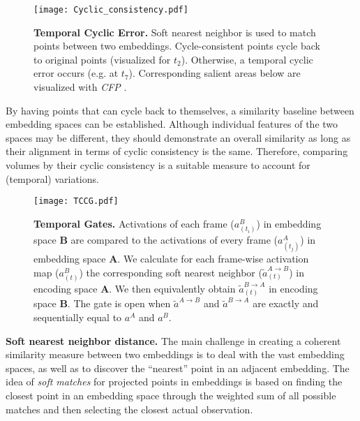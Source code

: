 \documentclass[final,5p,times,twocolumn]{elsarticle}
\begin{document}
\begin{figure}[!htb]
\centering
\texttt{[image: Cyclic\_consistency.pdf]}
\caption{\textbf{Temporal Cyclic Error.} Soft nearest neighbor is used to match points between two embeddings. Cycle-consistent points cycle back to original points (visualized for $t_{2}$). Otherwise, a temporal cyclic error occurs (e.g. at $t_{7}$). Corresponding salient areas below are visualized with \textit{CFP} \citep{stergiou2019class}.}
\label{fig:Cyclic_consistency}
\end{figure}

By having points that can cycle back to themselves, a similarity baseline between embedding spaces can be established. Although individual features of the two spaces may be different, they should demonstrate an overall similarity as long as their alignment in terms of cyclic consistency is the same. Therefore, comparing volumes by their cyclic consistency is a suitable measure to account for (temporal) variations.

\begin{figure*}
\centering
\texttt{[image: TCCG.pdf]}
\caption{\textbf{Temporal Gates.} Activations of each frame ($a_{(t_i)}^{B}$) in embedding space \textbf{B} are compared to the activations of every frame ($a_{(t_j)}^{A}$) in embedding space \textbf{A}. We calculate for each frame-wise activation map ($a_{(t)}^{B}$) the corresponding soft nearest neighbor ($\widetilde{a}^{A \rightarrow B}_{(t)}$) in encoding space \textbf{A}. We then equivalently obtain $\widetilde{a}_{(t)}^{B \rightarrow A}$ in encoding space \textbf{B}. The gate is open when $\widetilde{a}^{A \rightarrow B}$ and $\widetilde{a}^{B \rightarrow A}$ are exactly and sequentially equal to $a^{A}$ and $a^{B}$.}
\label{fig:TCG_pipeline}
\end{figure*}

\textbf{Soft nearest neighbor distance.} The main challenge in creating a coherent similarity measure between two embeddings is to deal with the vast embedding spaces, as well as to discover the ``nearest'' point in an adjacent embedding. The idea of \textit{soft matches} for projected points in embeddings \citep{goldberger2005neighbourhood} is based on finding the closest point in an embedding space through the weighted sum of all possible matches and then selecting the closest actual observation.
\end{document}
